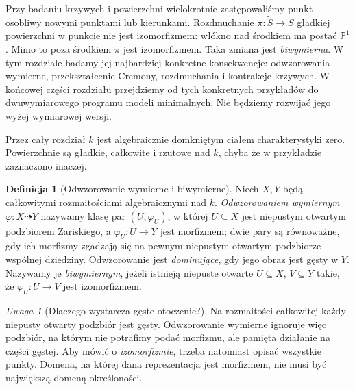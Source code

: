 \documentclass[11pt,a4paper,openany]{report}
\numberwithin{equation}{section}
\theoremstyle{plain}
\theoremstyle{definition}
\newtheorem{definicja}[twierdzenie]{Definicja}
\theoremstyle{remark}
\newtheorem{uwaga}[twierdzenie]{Uwaga}
\newcommand{\PP}{\mathbb P}
\begin{document}
Przy badaniu krzywych i powierzchni wielokrotnie zastępowaliśmy
punkt osobliwy nowymi punktami lub kierunkami. Rozdmuchanie
$\pi:\widetilde S\to S$ gładkiej powierzchni w punkcie
nie jest izomorfizmem: włókno nad środkiem ma postać $\PP^1$.
Mimo to poza środkiem $\pi$ jest izomorfizmem. Taka zmiana
jest \emph{biwymierna}. W tym rozdziale badamy jej najbardziej
konkretne konsekwencje: odwzorowania wymierne, przekształcenie
Cremony, rozdmuchania i kontrakcje krzywych.
W końcowej części rozdziału przejdziemy od tych
konkretnych przykładów do dwuwymiarowego programu
modeli minimalnych. Nie będziemy rozwijać jego
wyżej wymiarowej wersji.

Przez cały rozdział $k$ jest algebraicznie domkniętym ciałem
charakterystyki zero. Powierzchnie są gładkie, całkowite i
rzutowe nad $k$, chyba że w przykładzie zaznaczono inaczej.

\begin{definicja}[Odwzorowanie wymierne i biwymierne]
\label{def:ga8-rational}
Niech $X,Y$ będą całkowitymi rozmaitościami algebraicznymi
nad $k$. \emph{Odwzorowaniem wymiernym} $\varphi:X\dashrightarrow Y$
nazywamy klasę par $(U,\varphi_U)$, w której $U\subseteq X$
jest niepustym otwartym podzbiorem Zariskiego, a
$\varphi_U:U\to Y$ jest morfizmem; dwie pary są równoważne,
gdy ich morfizmy zgadzają się na pewnym niepustym
otwartym podzbiorze wspólnej dziedziny. Odwzorowanie jest
\emph{dominujące}, gdy jego obraz jest gęsty w $Y$.
Nazywamy je \emph{biwymiernym}, jeżeli istnieją niepuste
otwarte $U\subseteq X$, $V\subseteq Y$ takie, że
$\varphi_U:U\to V$ jest izomorfizmem.
\end{definicja}

\begin{uwaga}[Dlaczego wystarcza gęste otoczenie?]
Na rozmaitości całkowitej każdy niepusty otwarty
podzbiór jest gęsty. Odwzorowanie wymierne ignoruje
więc podzbiór, na którym nie potrafimy podać morfizmu,
ale pamięta działanie na części gęstej. Aby mówić o
\emph{izomorfizmie}, trzeba natomiast opisać wszystkie punkty.
Domena, na której dana reprezentacja jest morfizmem,
nie musi być największą domeną określoności.
\end{uwaga}
\end{document}
